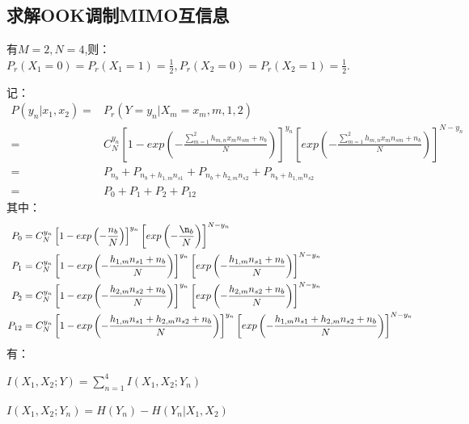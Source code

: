 \documentclass[12pt]{article}
\begin{document}
\subsection{求解OOK调制MIMO互信息}
有$M=2,N=4$,则：$P_r(X_1=0)=P_r(X_1=1)=\frac{1}{2},P_r(X_2=0)=P_r(X_2=1)=\frac{1}{2}$.
\par
记：
\begin{equation*}
    \begin{aligned}
       P(y_n|x_1,x_2)=&P_r(Y=y_n|X_m=x_m,m,1,2) \\
       =&C_N^{y_n}\left[1-exp\left(-\frac{\sum_{m=1}^2h_{m,n}x_{m}n_{sm}+n_b}{N}\right)\right]^{y_n}\left[exp\left(-\frac{\sum_{m=1}^2h_{m,n}x_{m}n_{sm}+n_b}{N}\right)\right]^{N-y_n} \\
       =&P_{n_b}+P_{n_b+h_{1,m}n_{s1}}+P_{n_b+h_{2,m}n_{s2}}+P_{n_b+h_{1,m}n_{s2}}\\
       =&P_0+P_1+P_2+P_{12}
    \end{aligned}
\end{equation*}
其中：
\begin{equation*}
    \begin{aligned}
       P_0&=C_N^{y_n}\left[1-exp\left(-\frac{n_b}{N}\right)\right]^{y_n}\left[exp\left(-\frac{\n_b}{N}\right)\right]^{N-y_n} \\
       P_1&=C_N^{y_n}\left[1-exp\left(-\frac{h_{1,m}n_{s1}+n_b}{N}\right)\right]^{y_n}\left[exp\left(-\frac{h_{1,m}n_{s1}+n_b}{N}\right)\right]^{N-y_n} \\
       P_2&=C_N^{y_n}\left[1-exp\left(-\frac{h_{2,m}n_{s2}+n_b}{N}\right)\right]^{y_n}\left[exp\left(-\frac{h_{2,m}n_{s2}+n_b}{N}\right)\right]^{N-y_n} \\
       P_{12}&=C_N^{y_n}\left[1-exp\left(-\frac{h_{1,m}n_{s1}+h_{2,m}n_{s2}+n_b}{N}\right)\right]^{y_n}\left[exp\left(-\frac{h_{1,m}n_{s1}+h_{2,m}n_{s2}+n_b}{N}\right)\right]^{N-y_n}
    \end{aligned}
\end{equation*}
有：\par
$I(X_1,X_2;Y)=\sum_{n=1}^4I(X_1,X_2;Y_n)$\par
$I(X_1,X_2;Y_n)=H(Y_n)-H(Y_n|X_1,X_2)$
\end{document}

